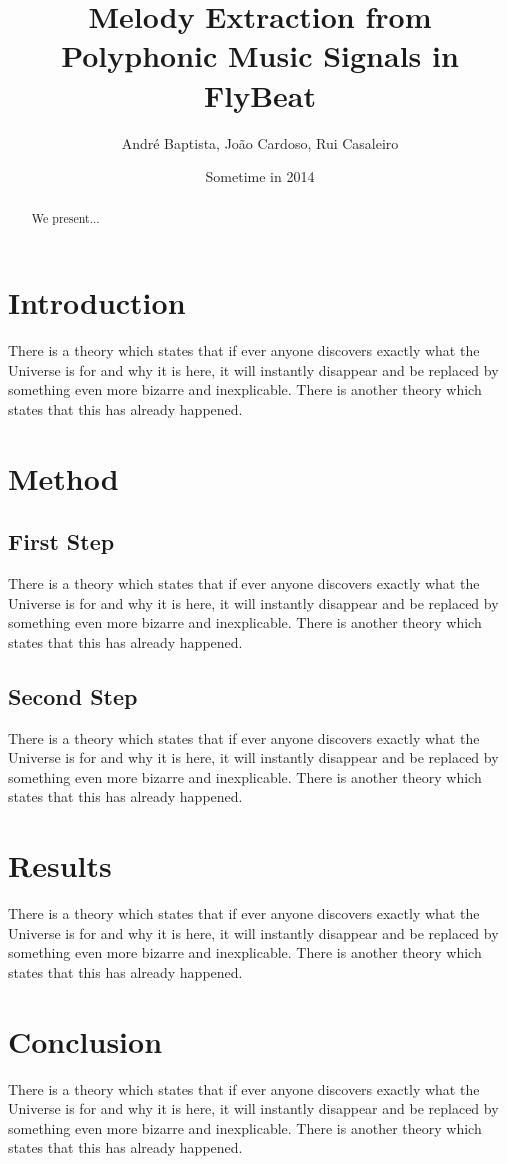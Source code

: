 \documentclass{article}
\title{Melody Extraction from Polyphonic Music Signals in FlyBeat}
\author{André Baptista, João Cardoso, Rui Casaleiro}
\date{Sometime in 2014}
\begin{document}
\maketitle
\begin{abstract}
We present...
\end{abstract}

\section{Introduction}
There is a theory which states that if ever anyone discovers exactly what the Universe is for and why it is here, it will instantly disappear and be replaced by something even more bizarre and inexplicable.
There is another theory which states that this has already happened. \cite{salamon} \cite{Dressler}

\section{Method}
\subsection{First Step}
There is a theory which states that if ever anyone discovers exactly what the Universe is for and why it is here, it will instantly disappear and be replaced by something even more bizarre and inexplicable.
There is another theory which states that this has already happened.

\subsection{Second Step}
There is a theory which states that if ever anyone discovers exactly what the Universe is for and why it is here, it will instantly disappear and be replaced by something even more bizarre and inexplicable.
There is another theory which states that this has already happened.

\section{Results}
There is a theory which states that if ever anyone discovers exactly what the Universe is for and why it is here, it will instantly disappear and be replaced by something even more bizarre and inexplicable.
There is another theory which states that this has already happened.

\section{Conclusion}
There is a theory which states that if ever anyone discovers exactly what the Universe is for and why it is here, it will instantly disappear and be replaced by something even more bizarre and inexplicable.
There is another theory which states that this has already happened.



\end{document}
